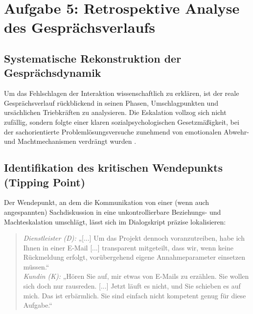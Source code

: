 
\chapter{Aufgabe 5: Retrospektive Analyse des Gesprächsverlaufs} 
\label{sec:aufgabe5}

\section{Systematische Rekonstruktion der Gesprächsdynamik}
Um das Fehlschlagen der Interaktion wissenschaftlich zu erklären, ist der reale Gesprächsverlauf rückblickend in seinen Phasen, Umschlagpunkten und ursächlichen Triebkräften zu analysieren. Die Eskalation vollzog sich nicht zufällig, sondern folgte einer klaren sozialpsychologischen Gesetzmäßigkeit, bei der sachorientierte Problemlösungsversuche zunehmend von emotionalen Abwehr- und Machtmechanismen verdrängt wurden \cite[S.~24]{5}.

\section{Identifikation des kritischen Wendepunkts (Tipping Point)}
Der Wendepunkt, an dem die Kommunikation von einer (wenn auch angespannten) Sachdiskussion in eine unkontrollierbare Beziehungs- und Machteskalation umschlägt, lässt sich im Dialogskript präzise lokalisieren:

\begin{quote}
\textit{Dienstleister (D):} „[...] Um das Projekt dennoch voranzutreiben, habe ich Ihnen in einer E-Mail [...] transparent mitgeteilt, dass wir, wenn keine Rückmeldung erfolgt, vorübergehend eigene Annahmeparameter einsetzen müssen.“ \\
\textit{Kundin (K):} „Hören Sie auf, mir etwas von E-Mails zu erzählen. Sie wollen sich doch nur rausreden. [...] Jetzt läuft es nicht, und Sie schieben es auf mich. Das ist erbärmlich. Sie sind einfach nicht kompetent genug für diese Aufgabe.“
\end{quote}

